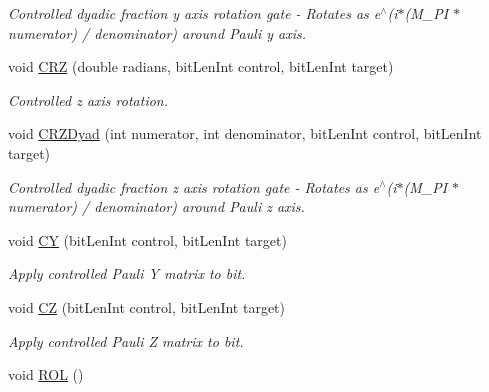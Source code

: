 \begin{DoxyCompactItemize}
\begin{DoxyCompactList}\small\item\em Controlled dyadic fraction y axis rotation gate -\/ Rotates as e$^\wedge$(i$\ast$(M\+\_\+\+PI $\ast$ numerator) / denominator) around Pauli y axis. \end{DoxyCompactList}\item 
void \hyperlink{classQrack_1_1Register_ae2387d321ac710f421e6964fc63a76de}{C\+RZ} (double radians, bit\+Len\+Int control, bit\+Len\+Int target)
\begin{DoxyCompactList}\small\item\em Controlled z axis rotation. \end{DoxyCompactList}\item 
void \hyperlink{classQrack_1_1Register_af46e24636c39c3c6cf77b9ed479466e8}{C\+R\+Z\+Dyad} (int numerator, int denominator, bit\+Len\+Int control, bit\+Len\+Int target)
\begin{DoxyCompactList}\small\item\em Controlled dyadic fraction z axis rotation gate -\/ Rotates as e$^\wedge$(i$\ast$(M\+\_\+\+PI $\ast$ numerator) / denominator) around Pauli z axis. \end{DoxyCompactList}\item 
void \hyperlink{classQrack_1_1Register_a0e8409d24488b562f5e9e62aa21c0a0f}{CY} (bit\+Len\+Int control, bit\+Len\+Int target)\hypertarget{classQrack_1_1Register_a0e8409d24488b562f5e9e62aa21c0a0f}{}\label{classQrack_1_1Register_a0e8409d24488b562f5e9e62aa21c0a0f}

\begin{DoxyCompactList}\small\item\em Apply controlled Pauli Y matrix to bit. \end{DoxyCompactList}\item 
void \hyperlink{classQrack_1_1Register_a0432629ef4d1d7e96451784e38d565ff}{CZ} (bit\+Len\+Int control, bit\+Len\+Int target)\hypertarget{classQrack_1_1Register_a0432629ef4d1d7e96451784e38d565ff}{}\label{classQrack_1_1Register_a0432629ef4d1d7e96451784e38d565ff}

\begin{DoxyCompactList}\small\item\em Apply controlled Pauli Z matrix to bit. \end{DoxyCompactList}\item 
void \hyperlink{classQrack_1_1Register_af8df2359bb1903834b63f7fed6ea3ba7}{R\+OL} ()\hypertarget{classQrack_1_1Register_af8df2359bb1903834b63f7fed6ea3ba7}{}\label{classQrack_1_1Register_af8df2359bb1903834b63f7fed6ea3ba7}


\end{DoxyCompactItemize}
